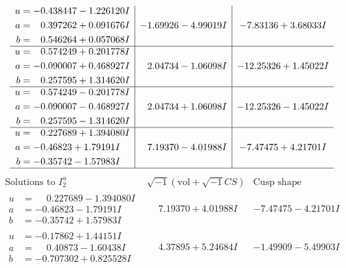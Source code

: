 \documentclass[1p]{elsarticle_modified}
\theoremstyle{definition}
\newcommand{\I}{\sqrt{-1}}
\begin{document}
$$\begin{array}{c|c|c}
\begin{aligned}
u &= -0.438447 - 1.226120 I \\
a &= \phantom{-}0.397262 + 0.091676 I \\
b &= \phantom{-}0.546264 + 0.057068 I\end{aligned}
 & -1.69926 - 4.99019 I & -7.83136 + 3.68033 I \\ \hline\begin{aligned}
u &= \phantom{-}0.574249 + 0.201778 I \\
a &= -0.090007 + 0.468927 I \\
b &= \phantom{-}0.257595 + 1.314620 I\end{aligned}
 & \phantom{-}2.04734 - 1.06098 I & -12.25326 + 1.45022 I \\ \hline\begin{aligned}
u &= \phantom{-}0.574249 - 0.201778 I \\
a &= -0.090007 - 0.468927 I \\
b &= \phantom{-}0.257595 - 1.314620 I\end{aligned}
 & \phantom{-}2.04734 + 1.06098 I & -12.25326 - 1.45022 I \\ \hline\begin{aligned}
u &= \phantom{-}0.227689 + 1.394080 I \\
a &= -0.46823 + 1.79191 I \\
b &= -0.35742 - 1.57983 I\end{aligned}
 & \phantom{-}7.19370 - 4.01988 I & -7.47475 + 4.21701 I\\
 \hline 
 \end{array}$$\newpage$$\begin{array}{c|c|c}  
\text{Solutions to }I^u_{2}& \I (\text{vol} + \sqrt{-1}CS) & \text{Cusp shape}\\
 \hline 
\begin{aligned}
u &= \phantom{-}0.227689 - 1.394080 I \\
a &= -0.46823 - 1.79191 I \\
b &= -0.35742 + 1.57983 I\end{aligned}
 & \phantom{-}7.19370 + 4.01988 I & -7.47475 - 4.21701 I \\ \hline\begin{aligned}
u &= -0.17862 + 1.44151 I \\
a &= \phantom{-}0.40873 - 1.60438 I \\
b &= -0.707302 + 0.825528 I\end{aligned}
 & \phantom{-}4.37895 + 5.24684 I & -1.49909 - 5.49903 I \\ \hline\begin{aligned}

\end{aligned}
\end{array}$$
\end{document}
